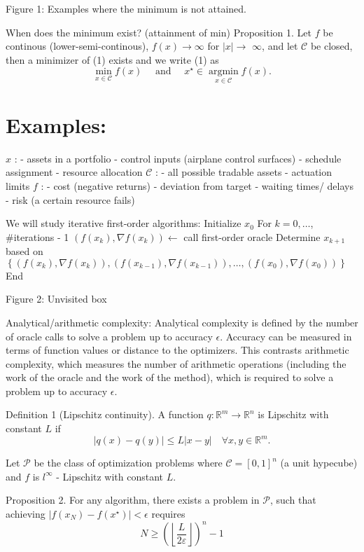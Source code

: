 Figure 1: Examples where the minimum is not attained.

When does the minimum exist? (attainment of min)
Proposition 1. Let $f$ be continous (lower-semi-continous), $f(x) \rightarrow \infty$ for $|x| \rightarrow$ $\infty$, and let $\mathcal{C}$ be closed, then a minimizer of (1) exists and we write (1) as
$$
	\min _{x \in \mathcal{C}} f(x) \quad \text { and } \quad x^{\star} \in \underset{x \in \mathcal{C}}{\operatorname{argmin}} f(x) .
$$

\section*{Examples:}
$x$ :
- assets in a portfolio
- control inputs (airplane control surfaces)
- schedule assignment
- resource allocation
$\mathcal{C}$ :
- all possible tradable assets
- actuation limits
$f$ :
- cost (negative returns)
- deviation from target
- waiting times/ delays
- risk (a certain resource fails)

We will study iterative first-order algorithms:
Initialize $x_{0}$
For $k=0, \ldots$, \#iterations - 1
$\left(f\left(x_{k}\right), \nabla f\left(x_{k}\right)\right) \leftarrow$ call first-order oracle
Determine $x_{k+1}$ based on $\left\{\left(f\left(x_{k}\right), \nabla f\left(x_{k}\right)\right),\left(f\left(x_{k-1}\right), \nabla f\left(x_{k-1}\right)\right), \ldots,\left(f\left(x_{0}\right), \nabla f\left(x_{0}\right)\right)\right\}$ End

Figure 2: Unvisited box

Analytical/arithmetic complexity: Analytical complexity is defined by the number of oracle calls to solve a problem up to accuracy $\epsilon$. Accuracy can be measured in terms of function values or distance to the optimizers. This contrasts arithmetic complexity, which measures the number of arithmetic operations (including the work of the oracle and the work of the method), which is required to solve a problem up to accuracy $\epsilon$.

Definition 1 (Lipschitz continuity). A function $q: \mathbb{R}^{m} \rightarrow \mathbb{R}^{n}$ is Lipschitz with constant $L$ if
$$
	|q(x)-q(y)| \leq L|x-y| \quad \forall x, y \in \mathbb{R}^{m} .
$$

Let $\mathcal{P}$ be the class of optimization problems where $\mathcal{C}=[0,1]^{n}$ (a unit hypecube) and $f$ is $l^{\infty}$ - Lipschitz with constant $L$.

Proposition 2. For any algorithm, there exists a problem in $\mathcal{P}$, such that achieving $\left|f\left(x_{N}\right)-f\left(x^{\star}\right)\right|<\epsilon$ requires
$$
	N \geq\left(\left\lfloor\frac{L}{2 \varepsilon}\right\rfloor\right)^{n}-1
$$

